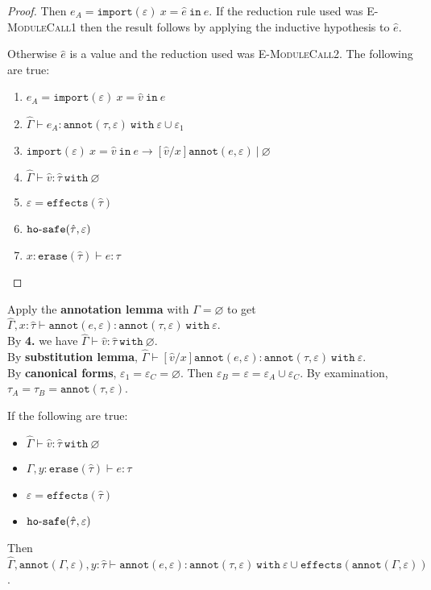 \documentclass{llncs}
\newcommand{\keywadj}[1]{\mathtt{#1}}
\newcommand{\keyw}[1]{\keywadj{#1}~}
\newcommand{\kw}[1]{\keyw{ #1 }}
\newcommand{\kwa}[1]{\keywadj{ #1 }}
\newcommand{\hyphen}{\hbox{-}}
\newcommand{\module}[0]{
\kwa{import}(\varepsilon)~x = \hat e~\kwa{in}~e
}
\begin{document}
\begin{proof}
\noindent
{}
Then $e_A = \module$. If the reduction rule used was \textsc{E-ModuleCall1} then the result follows by applying the inductive hypothesis to $\hat e$.

Otherwise $\hat e$ is a value and the reduction used was \textsc{E-ModuleCall2}. The following are true:
\begin{enumerate}
	\item $e_A = \kwa{import}(\varepsilon)~x = \hat v~\kw{in} e$
	\item $\hat \Gamma \vdash e_A: \kwa{annot}(\tau, \varepsilon)~\kw{with} \varepsilon \cup \varepsilon_1$
	\item $\kwa{import}(\varepsilon)~x = \hat v~\kw{in} e \longrightarrow [\hat v/x]\kwa{annot}(e, \varepsilon)~|~\varnothing$
	\item $\hat \Gamma \vdash \hat v: \hat \tau~\kw{with} \varnothing$
	\item $\varepsilon = \kwa{effects}(\hat \tau)$
	\item $\kwa{ho \hyphen safe}(\hat \tau, \varepsilon)$
	\item $x: \kwa{erase}(\hat \tau) \vdash e: \tau$
\end{enumerate}

\end{proof}

\noindent
Apply the \textbf{annotation lemma} with $\Gamma = \varnothing$ to get $\hat \Gamma, x: \hat \tau \vdash \kwa{annot}(e, \varepsilon): \kwa{annot}(\tau, \varepsilon)~\kw{with} \varepsilon$. \\

\noindent
By \textbf{4.} we have $\hat \Gamma \vdash \hat v: \hat \tau~\kw{with} \varnothing$. \\

\noindent
By \textbf{substitution lemma}, $\hat \Gamma \vdash [\hat v/x]\kwa{annot}(e, \varepsilon): \kwa{annot}(\tau, \varepsilon)~\kw{with} \varepsilon$. \\

\noindent
By \textbf{canonical forms}, $\varepsilon_1 = \varepsilon_C = \varnothing$. Then $\varepsilon_B = \varepsilon = \varepsilon_A \cup \varepsilon_C$. By examination, $\tau_A = \tau_B = \kwa{annot}(\tau, \varepsilon)$.


\hrulefill

\begin{lemma}[Annotation]
If the following are true:

\begin{itemize}
	\item $\hat \Gamma \vdash \hat v : \hat \tau~\kw{with} \varnothing$
	\item $\Gamma, y: \kwa{erase}(\hat \tau) \vdash e: \tau$
	\item $\varepsilon = \kwa{effects}(\hat \tau)$
	\item $\kwa{ho \hyphen safe}(\hat \tau, \varepsilon)$
\end{itemize}

\noindent
Then $\hat \Gamma, \kwa{annot}(\Gamma, \varepsilon), y: \hat \tau \vdash \kwa{annot}(e, \varepsilon) : \kwa{annot}(\tau, \varepsilon)~\kw{with} \varepsilon \cup \kwa{effects}(\kwa{annot}(\Gamma, \varepsilon))$.
\end{lemma}
\end{document}
